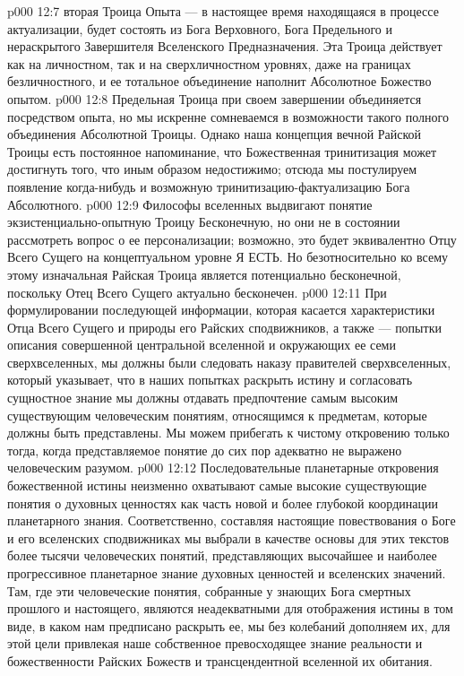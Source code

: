 \vs p000 12:7 \bibnobreakspace {} вторая Троица Опыта --- в настоящее время находящаяся в процессе актуализации, будет состоять из Бога Верховного, Бога Предельного и нераскрытого Завершителя Вселенского Предназначения. Эта Троица действует как на личностном, так и на сверхличностном уровнях, даже на границах безличностного, и ее тотальное объединение наполнит Абсолютное Божество опытом.
\vs p000 12:8 \pc Предельная Троица при своем завершении объединяется посредством опыта, но мы искренне сомневаемся в возможности такого полного объединения Абсолютной Троицы. Однако наша концепция вечной Райской Троицы есть постоянное напоминание, что Божественная тринитизация может достигнуть того, что иным образом недостижимо; отсюда мы постулируем появление когда\hyp{}нибудь  и возможную тринитизацию\hyp{}фактуализацию Бога Абсолютного.
\vs p000 12:9 \pc Философы вселенных выдвигают понятие  экзистенциально\hyp{}опытную Троицу Бесконечную, но они не в состоянии рассмотреть вопрос о ее персонализации; возможно, это будет эквивалентно Отцу Всего Сущего на концептуальном уровне Я ЕСТЬ. Но безотносительно ко всему этому изначальная Райская Троица является потенциально бесконечной, поскольку Отец Всего Сущего актуально бесконечен.
\vs p000 12:11 При формулировании последующей информации, которая касается характеристики Отца Всего Сущего и природы его Райских сподвижников, а также --- попытки описания совершенной центральной вселенной и окружающих ее семи сверхвселенных, мы должны были следовать наказу правителей сверхвселенных, который указывает, что в наших попытках раскрыть истину и согласовать сущностное знание мы должны отдавать предпочтение самым высоким существующим человеческим понятиям, относящимся к предметам, которые должны быть представлены. Мы можем прибегать к чистому откровению только тогда, когда представляемое понятие до сих пор адекватно не выражено человеческим разумом.
\vs p000 12:12 Последовательные планетарные откровения божественной истины неизменно охватывают самые высокие существующие понятия о духовных ценностях как часть новой и более глубокой координации планетарного знания. Соответственно, составляя настоящие повествования о Боге и его вселенских сподвижниках мы выбрали в качестве основы для этих текстов более тысячи человеческих понятий, представляющих высочайшее и наиболее прогрессивное планетарное знание духовных ценностей и вселенских значений. Там, где эти человеческие понятия, собранные у знающих Бога смертных прошлого и настоящего, являются неадекватными для отображения истины в том виде, в каком нам предписано раскрыть ее, мы без колебаний дополняем их, для этой цели привлекая наше собственное превосходящее знание реальности и божественности Райских Божеств и трансцендентной вселенной их обитания.
